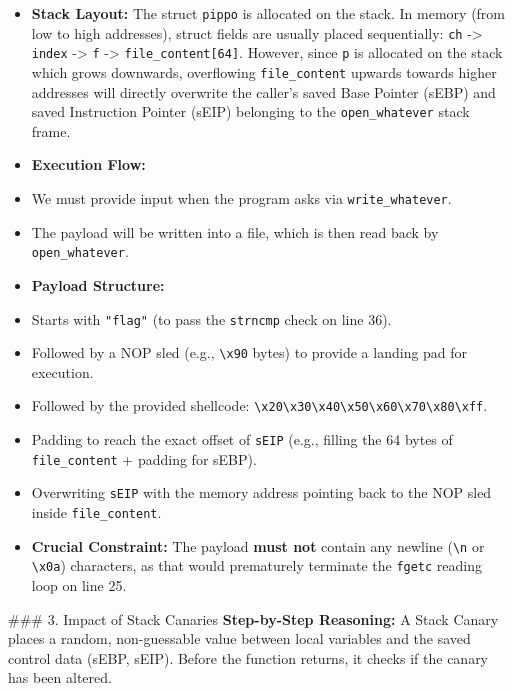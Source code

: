 \documentclass{article}
\begin{document}
\begin{itemize}
    \item[\textbf{1.}] \textbf{Stack Layout:} The struct \texttt{pippo} is allocated on the stack. In memory (from low to high addresses), struct fields are usually placed sequentially: \texttt{ch} -> \texttt{index} -> \texttt{f} -> \texttt{file\_content[64]}. However, since \texttt{p} is allocated on the stack which grows downwards, overflowing \texttt{file\_content} upwards towards higher addresses will directly overwrite the caller's saved Base Pointer (sEBP) and saved Instruction Pointer (sEIP) belonging to the \texttt{open\_whatever} stack frame.
    \item[\textbf{2.}] \textbf{Execution Flow:}
    \item We must provide input when the program asks via \texttt{write\_whatever}.
    \item The payload will be written into a file, which is then read back by \texttt{open\_whatever}.
    \item[\textbf{3.}] \textbf{Payload Structure:}
    \item Starts with \texttt{"flag"} (to pass the \texttt{strncmp} check on line 36).
    \item Followed by a NOP sled (e.g., \texttt{\textbackslash{}x90} bytes) to provide a landing pad for execution.
    \item Followed by the provided shellcode: \texttt{\textbackslash{}x20\textbackslash{}x30\textbackslash{}x40\textbackslash{}x50\textbackslash{}x60\textbackslash{}x70\textbackslash{}x80\textbackslash{}xff}.
    \item Padding to reach the exact offset of \texttt{sEIP} (e.g., filling the 64 bytes of \texttt{file\_content} + padding for sEBP).
    \item Overwriting \texttt{sEIP} with the memory address pointing back to the NOP sled inside \texttt{file\_content}.
    \item \textbf{Crucial Constraint:} The payload \textbf{must not} contain any newline (\texttt{\textbackslash{}n} or \texttt{\textbackslash{}x0a}) characters, as that would prematurely terminate the \texttt{fgetc} reading loop on line 25.

\end{itemize}
\#\#\# 3. Impact of Stack Canaries
\textbf{Step-by-Step Reasoning:}
A Stack Canary places a random, non-guessable value between local variables and the saved control data (sEBP, sEIP). Before the function returns, it checks if the canary has been altered.
\end{document}
